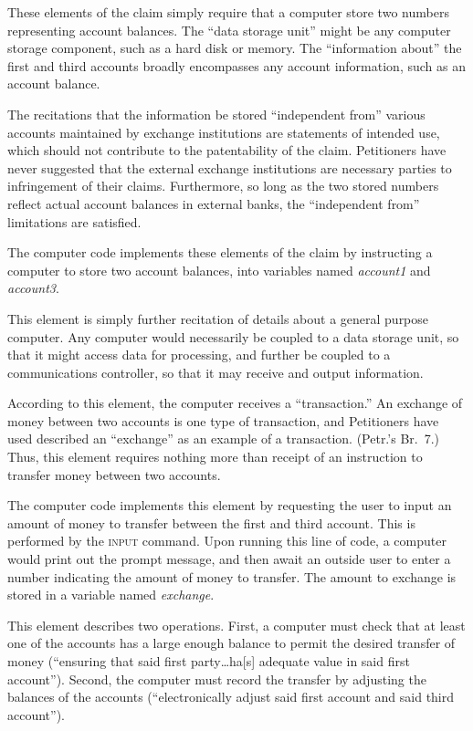 \documentclass{scotus}
\begin{document}
These elements of the claim simply require that a computer store two numbers
representing account balances. The ``data storage unit'' might be any computer
storage component, such as a hard disk or memory. The ``information about'' the
first and third accounts broadly encompasses any account information, such as an
account balance.

The recitations that the information be stored ``independent from'' various
accounts maintained by exchange institutions are statements of intended
use, which should not contribute to the patentability of the claim. Petitioners
have never suggested that the external exchange institutions are necessary
parties to infringement of their claims. Furthermore, so long as the two stored
numbers reflect actual account balances in external banks, the ``independent
from'' limitations are satisfied.

The computer code implements these elements of the claim by instructing a
computer to store two account balances, into variables named \emph{account1} and
\emph{account3}.


This element is simply further recitation of details about a general purpose
computer. Any computer would necessarily be coupled to a data storage unit, so
that it might access data for processing, and further be coupled to a
communications controller, so that it may receive and output information.


According to this element, the computer receives a ``transaction.'' An exchange
of money between two accounts is one type of transaction, and Petitioners have
used described an ``exchange'' as an example of a transaction. (Petr.'s Br.\ 7.)
Thus, this
element requires nothing more than receipt of an instruction to transfer money
between two accounts.

The computer code implements this element by requesting the user to input an
amount of money to
transfer between the first and third account. This is performed by the
\textsc{input} command. Upon running this line of code,
a computer would print out the prompt message, and then await an outside user to
enter a number indicating the amount of money to transfer. The amount to
exchange is stored in a variable named \emph{exchange}.


This element describes two operations. First, a computer must check that at
least one of the accounts has a large enough balance to permit the desired
transfer of money (``ensuring that said first party\ldots ha[s] adequate value
in
said first account''). Second, the computer must record the transfer by
adjusting the balances of the accounts (``electronically adjust said first
account and said third account'').
\end{document}

